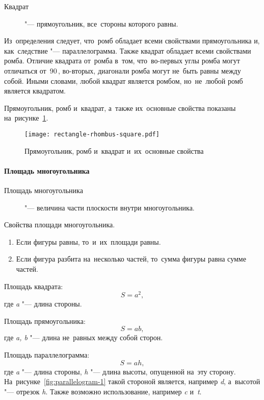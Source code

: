\documentclass[]{scrartcl}
\begin{document}
\begin{description}
	\item[Квадрат] "--- прямоугольник, все~стороны которого равны.
\end{description}
Из~определения следует, что~ромб обладает всеми свойствами прямоугольника и, как~следствие "--- параллелограмма. Также квадрат обладает всеми свойствами ромба. Отличие квадрата от~ромба в~том, что~во-первых углы ромба могут отличаться от~90\,\textdegree, во-вторых, диагонали ромба могут не~быть равны между собой. Иными словами, любой квадрат является ромбом, но~не~любой ромб является квадратом.

Прямоугольник, ромб и~квадрат, а~также их~основные свойства показаны на~рисунке~\ref{fig:rectangle-rhombus-square}.

\begin{figure}[ht]
	\centering %
	\texttt{[image: rectangle-rhombus-square.pdf]}
	\caption{Прямоугольник, ромб и~квадрат и~их~основные свойства}\label{fig:rectangle-rhombus-square}
\end{figure}

\paragraph{Площадь многоугольника}
\begin{description}
	\item[Площадь многоугольника] "--- величина части плоскости внутри многоугольника.
\end{description}
Свойства площади многоугольника.
\begin{enumerate}
	\item Если фигуры равны, то~и~их~площади равны.
	\item Если фигура разбита на~несколько частей, то~сумма фигуры равна сумме частей.
\end{enumerate}
Площадь квадрата:
\begin{equation}\label{eq:square-square}
S=a^2,
\end{equation}
где \textit{a} "--- длина стороны.

Площадь прямоугольника:
\begin{equation}\label{eq:rectangle-square}
S=ab,
\end{equation}
где \textit{a, b} "--- длина не~равных между собой сторон.

Площадь параллелограмма:
\begin{equation}\label{eq:parallelogram-square}
S=ah,
\end{equation}
где \textit{a} "--- длина стороны, \textit{h} "--- длина высоты, опущенной на~эту сторону. На~рисунке~\ref{fig:parallelogram-1} такой стороной является, например \textit{d}, а~высотой "--- отрезок \textit{h}. Также возможно использование, например \textit{c} и~\textit{t}.
\end{document}

